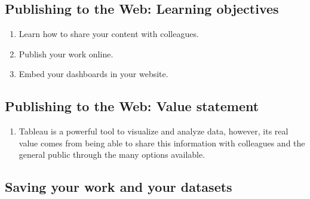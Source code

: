 \documentclass[
]{book}
\providecommand{\tightlist}{%
  \setlength{\itemsep}{0pt}\setlength{\parskip}{0pt}}
\begin{document}
\hypertarget{publishing-to-the-web-learning-objectives}{%
\subsection{Publishing to the Web: Learning objectives}\label{publishing-to-the-web-learning-objectives}}

\begin{enumerate}
\def\labelenumi{\arabic{enumi}.}
\tightlist
\item
  Learn how to share your content with colleagues.
\item
  Publish your work online.
\item
  Embed your dashboards in your website.
\end{enumerate}

\hypertarget{publishing-to-the-web-value-statement}{%
\subsection{Publishing to the Web: Value statement}\label{publishing-to-the-web-value-statement}}

\begin{enumerate}
\def\labelenumi{\arabic{enumi}.}
\tightlist
\item
  Tableau is a powerful tool to visualize and analyze data, however, its real value comes from being able to share this information with colleagues and the general public through the many options available.
\end{enumerate}

\hypertarget{saving-your-work-and-your-datasets}{%
\subsection{Saving your work and your datasets}\label{saving-your-work-and-your-datasets}}
\end{document}
